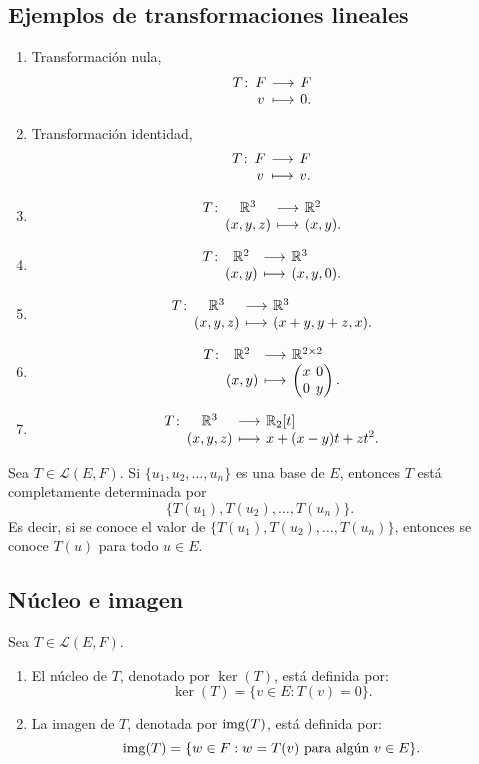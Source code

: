 \documentclass[a4,11pt]{aleph-notas}
\begin{document}
\subsection{Ejemplos de transformaciones lineales}
\begin{enumerate}
\item 
    Transformación nula, \[\funcion{T}{F}{F}{v}{0.}\]
\item 
    Transformación identidad, \[\funcion{T}{F}{F}{v}{v.}\]
\item 
    \[
        \funcion{T}{\R^3}{\R^2}
            {(x,y,z)}{(x, y).}
    \]
\item 
    \[
        \funcion{T}{\R^2}{\R^3}
            {(x,y)}{(x, y,0).}
    \]
\item 
    \[
        \funcion{T}{\R^3}{\R^3}
            {(x,y,z)}{(x+y, y + z,x).}
    \]
\item 
    \[
        \funcion{T}{\R^2}{\Mat{2}{2}}
            {(x,y)}{\begin{pmatrix}x& 0\\ 0 &y\end{pmatrix}.}
    \]
\item 
    \[
        \funcion{T}{\R^3}{\R_2[t]}
            {(x,y,z)}{x+(x-y)t + zt^2.}
    \]
\end{enumerate}



\begin{teo}
    Sea $T \in \mathcal{L}(E,F)$. Si $\{u_1,u_2,\ldots,u_n\}$ es una base de $E$, entonces $T$ está completamente determinada por
    \[
        \{T(u_1),T(u_2),\ldots,T(u_n)\}.
    \]
    Es decir, si se conoce el valor de $\{T(u_1),T(u_2),\ldots,T(u_n)\}$, entonces se conoce $T(u)$ para todo $u\in E$.
\end{teo}


\subsection{Núcleo e imagen}

\begin{defi}
    Sea $T \in \mathcal{L}(E,F)$.
    \begin{enumerate}
    \item 
        El núcleo de $T$, denotado por $\ker(T)$, está definida por:
        \[
            \ker(T) = \{v \in E: T(v) = 0\}.
        \]
    \item 
        La imagen de $T$, denotada por $\operatorname{img}(T)$, está definida por:
        \[
            \operatorname{img}(T) = \{ w \in F: w = T(v) \text{ para algún } v \in E\}.
        \]
    \end{enumerate}
\end{defi}
\end{document}
